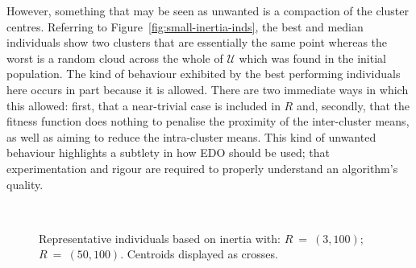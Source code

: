 \documentclass[smallextended]{svjour3}
\newlength{\imgwidth}
\begin{document}
However, something that may be seen as unwanted is a compaction of the cluster
centres. Referring to Figure~\ref{fig:small-inertia-inds}, the best and median
individuals show two clusters that are essentially the same point whereas the
worst is a random cloud across the whole of \(\mathcal{U}\) which was found in
the initial population. The kind of behaviour exhibited by the best performing
individuals here occurs in part because it is allowed. There are two immediate
ways in which this allowed: first, that a near-trivial case is included in \(R\)
and, secondly, that the fitness function does nothing to penalise the proximity
of the inter-cluster means, as well as aiming to reduce the intra-cluster means.
This kind of unwanted behaviour highlights a subtlety in how EDO should be used;
that experimentation and rigour are required to properly understand an
algorithm's quality.

\begin{figure}[htbp]
    \centering
    \\

    \caption[]{%
        Representative individuals based on inertia with:
         \(R~=~(3,100)\);
         \(R~=~(50,100)\). Centroids displayed as
        crosses.
    }\label{fig:inertia-inds}
\end{figure}
\end{document}
